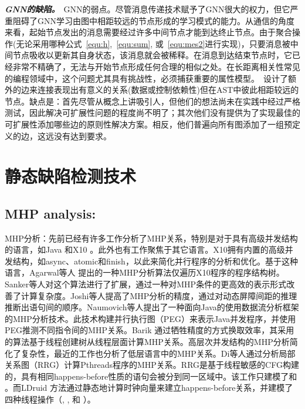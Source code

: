 \vspace*{3pt}
\noindent
\textbf{\textit{GNN的缺陷。}}\,
GNN的弱点。尽管消息传递技术赋予了GNN很大的权力，但它严重阻碍了GNN学习由图中相距较远的节点形成的学习模式的能力。从通信的角度来看，起始节点发出的消息需要经过许多中间节点才能到达终止节点。由于聚合操作(无论采用哪种公式~\ref{equ:h},~\ref{equ:sum}, 或~\ref{equ:mes2}进行实现)，只要消息被中间节点吸收以更新其自身状态，该消息就会被稀释。在消息到达结束节点时，它已经非常不精确了，无法与开始节点形成任何合理的相似之处。在长距离相关性常见的编程领域中，这个问题尤其具有挑战性，必须捕获重要的属性模型。~\citet{allamanis2017learning}设计了额外的边来连接表现出有意义的关系(\eg 数据或控制依赖性)但在AST中彼此相距较远的节点。缺点是：首先尽管从概念上讲吸引人，但他们的想法尚未在实践中经过严格测试，因此解决可扩展性问题的程度尚不明了；其次他们没有提供为了实现最佳的可扩展性添加哪些边的原则性解决方案。相反，他们普遍向所有图添加了一组预定义的边，这远没有达到要求。

\section{静态缺陷检测技术}\label{sec:related:static}

\subsection{MHP analysis:}
MHP分析：先前已经有许多工作分析了MHP关系，特别是对于具有高级并发结构的语言，如Java \cite{barik2005efficient, naumovich1999efficient} 和X10 \cite{agarwal2007may, albert2015may, sankar2016improved}。此外也有工作聚焦于其它语言\cite{zhou2018may, joshi2012new, sui2016sparse, di2015region}。X10拥有内置的高级并发结构，如async、atomic和finish，以此来简化并行程序的分析和优化。基于这种语言，Agarwal等人 \cite{agarwal2007may}提出的一种MHP分析算法仅遍历X10程序的程序结构树。Sanker等人\cite{sankar2016improved}对这个算法进行了扩展，通过一种对MHP条件的更高效的表示形式改善了计算复杂度。Joshi等人\cite{joshi2012new}提高了MHP分析的精度，通过对动态屏障间距的推理推断出语句间的顺序。Naumovich等人\cite{naumovich1999efficient}提出了一种面向Java的使用数据流分析框架的MHP分析技术。此技术构建并行执行图（PEG）来表示Java并发程序，并使用PEG推测不同指令间的MHP关系。Barik\cite{barik2005efficient} 通过牺牲精度的方式换取效率，其采用的算法基于线程创建树从线程层面计算MHP关系。高层次并发结构的MHP分析简化了复杂性，最近的工作也分析了低层语言中的MHP关系。Di等人\cite{di2015region}通过分析局部关系图（RRG）计算Pthreads程序的MHP关系。RRG是基于线程敏感的CFG构建的，具有相同happens-before性质的语句会被分到同一区域中。该工作只建模了\create 和 \join。而LDruid\cite{zhou2018may} 方法通过静态地计算时钟向量来建立happens-before关系，并建模了四种线程操作（\create, \join, \wait 和 \notify）。

